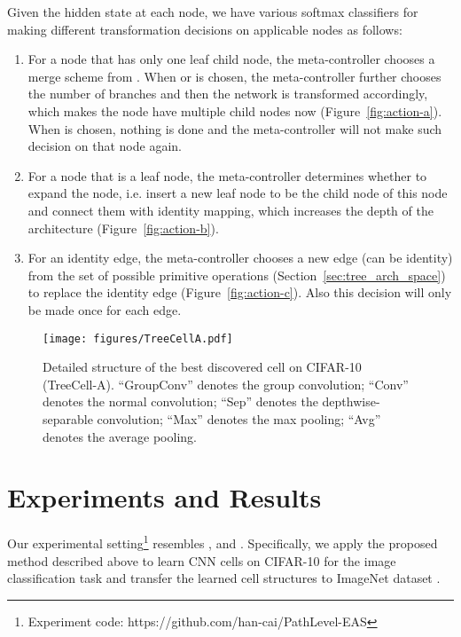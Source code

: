 \documentclass{article}
\begin{document}
Given the hidden state at each node, we have various softmax classifiers for making different transformation decisions on applicable nodes as follows:

\begin{enumerate}
	\item For a node that has only one leaf child node, the meta-controller chooses a merge scheme from . When  or  is chosen, the meta-controller further chooses the number of branches and then the network is transformed accordingly, which makes the node have multiple child nodes now (Figure~\ref{fig:action-a}). When  is chosen, nothing is done and the meta-controller will not make such decision on that node again. 
	\item For a node that is a leaf node, the meta-controller determines whether to expand the node, i.e. insert a new leaf node to be the child node of this node and connect them with identity mapping, which increases the depth of the architecture (Figure~\ref{fig:action-b}).
	\item For an identity edge, the meta-controller chooses a new edge (can be identity) from the set of possible primitive operations (Section~\ref{sec:tree_arch_space}) to replace the identity edge (Figure~\ref{fig:action-c}). Also this decision will only be made once for each edge. 
\end{enumerate}

\begin{figure}[t]
	\centering
	\texttt{[image: figures/TreeCellA.pdf]}
    \vspace{-10pt}
	\caption{Detailed structure of the best discovered cell on CIFAR-10 (TreeCell-A). ``GroupConv'' denotes the group convolution; ``Conv'' denotes the normal convolution; ``Sep'' denotes the depthwise-separable convolution; ``Max'' denotes the max pooling; ``Avg'' denotes the average pooling.}
	\label{fig:tree-cell-a}
\end{figure}

\section{Experiments and Results}\label{sec:exp}
Our experimental setting\footnote{Experiment code: https://github.com/han-cai/PathLevel-EAS} resembles \citet{zoph2017learning}, \citet{zhong2017practical} and \citet{liu2017hierarchical}. Specifically, we apply the proposed method described above to learn CNN cells on CIFAR-10 \cite{krizhevsky2009learning} for the image classification task and transfer the learned cell structures to ImageNet dataset \cite{deng2009imagenet}.
\end{document}
